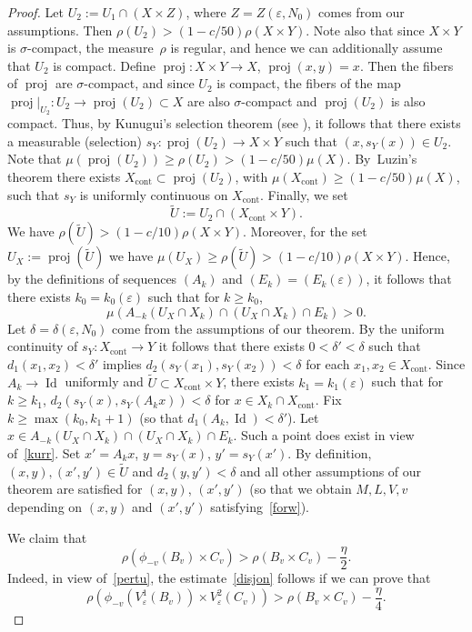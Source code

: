 \documentclass[10pt]{amsart}
\let\epsilon\varepsilon
\DeclareMathOperator{\Id}{Id}
\DeclareMathOperator{\proj}{proj}
\newcommand{\cont}{\mathrm{cont}}
\theoremstyle{definition}
\theoremstyle{plain}
\begin{document}
\begin{proof}
Let $U_2:=U_1\cap (X\times Z)$, where $Z=Z(\epsilon,N_0)$ comes from our assumptions. Then $\rho(U_2)>(1-c/50)\rho(X\times Y)$.
Note also that since $X\times Y$ is $\sigma$-compact, the measure~$\rho$ is regular, and hence we can additionally assume that $U_2$ is compact.
Define $\proj:X\times Y\to X$, $\proj(x,y)=x$. Then the fibers of $\proj$ are $\sigma$-compact, and since $U_2$ is compact, the fibers of the map $\proj|_{U_2}:U_2\to \proj(U_2)\subset X$ are also $\sigma$-compact and $\proj(U_2)$ is also compact. Thus, by Kunugui's selection theorem (see \eg \cite[Th.\,4.1]{Ga-Le-Sch}), it follows that there exists a measurable (selection) $s_Y :\proj(U_2)\to X\times Y$ such that $(x,s_Y(x))\in U_2$. Note that $\mu(\proj(U_2))\geq \rho(U_2)>(1-c/50)\mu(X)$. By~Luzin's theorem there exists $X_\cont\subset \proj(U_2)$, with $\mu(X_\cont)\geq (1-c/50)\mu(X)$, such that $s_Y$ is uniformly continuous on $X_\cont$. Finally, we set
\[
\widetilde{U}:=U_2\cap (X_\cont\times Y).
\]
We have $\rho(\widetilde{U})>(1-c/10)\rho(X\times Y)$. Moreover, for the set $U_X:=\proj(\widetilde{U})$ we have
$\mu(U_X)\geq \rho(\widetilde{U})>(1-c/10)\rho(X\times Y)$.
Hence, by the definitions of sequences $(A_k)$ and $(E_k)=(E_k(\epsilon))$, it follows that there exists $k_0=k_0(\epsilon)$ such that for $k\geq k_0$,
\begin{equation}\label{kurr}
\mu(A_{-k}(U_X\cap X_k)\cap (U_X\cap X_k)\cap E_k)>0.
\end{equation}
Let $\delta=\delta(\epsilon,N_0)$ come from the assumptions of our theorem. By the uniform continuity of $s_Y:X_\cont\to Y$ it follows that there exists $0<\delta'<\delta$ such that $d_1(x_1,x_2)<\delta'$ implies $d_2(s_Y(x_1),s_Y(x_2))<\delta$ for each $x_1,x_2\in X_\cont$.
Since $A_k\to \Id$ uniformly
and $\widetilde{U}\subset X_\cont\times Y$, there exists $k_1=k_1(\epsilon)$ such that for $k\geq k_1$, $d_2(s_Y(x),s_Y(A_kx))<\delta$ for $x\in X_k\cap X_\cont$. Fix $k\geq \max(k_0,k_1+1)$ (so that $d_1(A_k,\Id)<\delta'$). Let $x\in A_{-k}(U_X\cap X_k)\cap (U_X\cap X_k)\cap E_k$. Such a point does exist in view of~\eqref{kurr}. Set $x'=A_kx$, $y=s_Y(x)$, $y'=s_Y(x')$. By definition, $(x,y),(x',y')\in \widetilde{U}$ and $d_2(y,y')<\delta$ and all other assumptions of our theorem are satisfied for $(x,y)$, $(x',y')$ (so that we obtain $M,L,V,v$ depending on $(x,y)$ and $(x',y')$ satisfying~\eqref{forw}).

We claim that
\begin{equation}\label{disjon}
\rho(\phi_{-v}(B_v)
\times C_v)>\rho(B_v\times C_v)-\frac{\eta}{2}.
\end{equation}
Indeed, in view of~\eqref{pertu}, the estimate~\eqref{disjon} follows if we can prove that
\[
\rho(\phi_{-v}(V^1_{\epsilon}(B_v))
\times V^2_{\epsilon}(C_v))>\rho(B_v\times C_v)-\frac{\eta}{4}.
\]


\end{proof}
\end{document}
